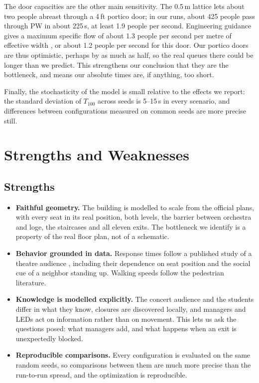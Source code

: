 \documentclass{article}
\begin{document}
The door capacities are the other main sensitivity. The 0.5\,m lattice lets about two people abreast through a 4\,ft portico door; in our runs, about 425 people pass through PW in about 225\,s, at least 1.9 people per second. Engineering guidance gives a maximum specific flow of about 1.3 people per second per metre of effective width \cite{sfpe2016}, or about 1.2 people per second for this door. Our portico doors are thus optimistic, perhaps by as much as half, so the real queues there could be longer than we predict. This strengthens our conclusion that they are the bottleneck, and means our absolute times are, if anything, too short.

Finally, the stochasticity of the model is small relative to the effects we report: the standard deviation of $T_{100}$ across seeds is 5--15\,s in every scenario, and differences between configurations measured on common seeds are more precise still.

\section{Strengths and Weaknesses}
\subsection{Strengths}
\begin{itemize}
    \item \textbf{Faithful geometry.} The building is modelled to scale from the official plans, with every seat in its real position, both levels, the barrier between orchestra and loge, the staircases and all eleven exits. The bottleneck we identify is a property of the real floor plan, not of a schematic.
    \item \textbf{Behavior grounded in data.} Response times follow a published study of a theatre audience \cite{galea2017}, including their dependence on seat position and the social cue of a neighbor standing up. Walking speeds follow the pedestrian literature.
    \item \textbf{Knowledge is modelled explicitly.} The concert audience and the students differ in what they know, closures are discovered locally, and managers and LEDs act on information rather than on movement. This lets us ask the questions posed: what managers add, and what happens when an exit is unexpectedly blocked.
    \item \textbf{Reproducible comparisons.} Every configuration is evaluated on the same random seeds, so comparisons between them are much more precise than the run-to-run spread, and the optimization is reproducible.
\end{itemize}
\end{document}
